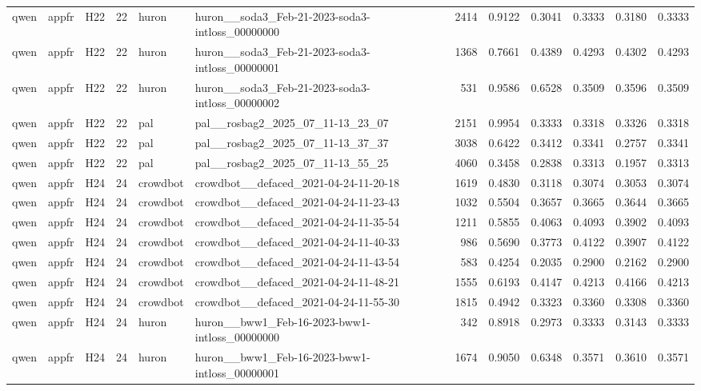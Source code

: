 \begin{table}[tbp]
\begin{tabular}{lllrllrrrrrr}
qwen & appfr & H22 & 22 & huron & huron\_\_soda3\_Feb-21-2023-soda3-intloss\_00000000 & 2414 & 0.9122 & 0.3041 & 0.3333 & 0.3180 & 0.3333 \\
qwen & appfr & H22 & 22 & huron & huron\_\_soda3\_Feb-21-2023-soda3-intloss\_00000001 & 1368 & 0.7661 & 0.4389 & 0.4293 & 0.4302 & 0.4293 \\
qwen & appfr & H22 & 22 & huron & huron\_\_soda3\_Feb-21-2023-soda3-intloss\_00000002 & 531 & 0.9586 & 0.6528 & 0.3509 & 0.3596 & 0.3509 \\
qwen & appfr & H22 & 22 & pal & pal\_\_rosbag2\_2025\_07\_11-13\_23\_07 & 2151 & 0.9954 & 0.3333 & 0.3318 & 0.3326 & 0.3318 \\
qwen & appfr & H22 & 22 & pal & pal\_\_rosbag2\_2025\_07\_11-13\_37\_37 & 3038 & 0.6422 & 0.3412 & 0.3341 & 0.2757 & 0.3341 \\
qwen & appfr & H22 & 22 & pal & pal\_\_rosbag2\_2025\_07\_11-13\_55\_25 & 4060 & 0.3458 & 0.2838 & 0.3313 & 0.1957 & 0.3313 \\
qwen & appfr & H24 & 24 & crowdbot & crowdbot\_\_defaced\_2021-04-24-11-20-18 & 1619 & 0.4830 & 0.3118 & 0.3074 & 0.3053 & 0.3074 \\
qwen & appfr & H24 & 24 & crowdbot & crowdbot\_\_defaced\_2021-04-24-11-23-43 & 1032 & 0.5504 & 0.3657 & 0.3665 & 0.3644 & 0.3665 \\
qwen & appfr & H24 & 24 & crowdbot & crowdbot\_\_defaced\_2021-04-24-11-35-54 & 1211 & 0.5855 & 0.4063 & 0.4093 & 0.3902 & 0.4093 \\
qwen & appfr & H24 & 24 & crowdbot & crowdbot\_\_defaced\_2021-04-24-11-40-33 & 986 & 0.5690 & 0.3773 & 0.4122 & 0.3907 & 0.4122 \\
qwen & appfr & H24 & 24 & crowdbot & crowdbot\_\_defaced\_2021-04-24-11-43-54 & 583 & 0.4254 & 0.2035 & 0.2900 & 0.2162 & 0.2900 \\
qwen & appfr & H24 & 24 & crowdbot & crowdbot\_\_defaced\_2021-04-24-11-48-21 & 1555 & 0.6193 & 0.4147 & 0.4213 & 0.4166 & 0.4213 \\
qwen & appfr & H24 & 24 & crowdbot & crowdbot\_\_defaced\_2021-04-24-11-55-30 & 1815 & 0.4942 & 0.3323 & 0.3360 & 0.3308 & 0.3360 \\
qwen & appfr & H24 & 24 & huron & huron\_\_bww1\_Feb-16-2023-bww1-intloss\_00000000 & 342 & 0.8918 & 0.2973 & 0.3333 & 0.3143 & 0.3333 \\
qwen & appfr & H24 & 24 & huron & huron\_\_bww1\_Feb-16-2023-bww1-intloss\_00000001 & 1674 & 0.9050 & 0.6348 & 0.3571 & 0.3610 & 0.3571 \\

\end{tabular}
\end{table}
